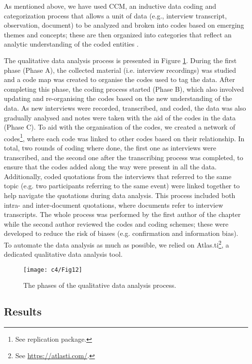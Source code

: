 As mentioned above, we have used CCM, an inductive data coding and categorization process that allows a unit of data (e.g., interview transcript, observation, document) to be analyzed and broken into codes based on emerging themes and concepts; these are then organized into categories that reflect an analytic understanding of the coded entities \cite{Mathison2005}.

The qualitative data analysis process is presented in Figure \ref{c4:fig:qualitative-analysis}. During the first phase (Phase A), the collected material (i.e. interview recordings) was studied and a code map was created to organise the codes used to tag the data.
After completing this phase, the coding process started (Phase B), which also involved updating and re-organising the codes based on the new understanding of the data.
As new interviews were recorded, transcribed, and coded, the data was also gradually analysed and notes were taken with the aid of the codes in the data (Phase C).
To aid with the organisation of the codes, we created a network of codes\footnote{See replication package.}, where each code was linked to other codes based on their relationship.
In total, two rounds of coding where done, the first one as interviews were transcribed, and the second one after the transcribing process was completed, to ensure that the codes added along the way were present in all the data.
Additionally, coded quotations from the interviews that referred to the same topic (e.g. two participants referring to the same event) were linked together to help navigate the quotations during data analysis. This process included both intra- and inter-document quotations, where documents refer to interview transcripts.
The whole process was performed by the first author of the chapter while the second author reviewed the codes and coding schemes; these were developed to reduce the risk of biases (e.g. confirmation and information bias).
To automate the data analysis as much as possible, we relied on Atlas.ti\footnote{See \url{https://atlasti.com/}.}, a dedicated qualitative data analysis tool.

\begin{figure}
    \centering
    \texttt{[image: c4/Fig12]}
    \caption{The phases of the qualitative data analysis process.}\label{c4:fig:qualitative-analysis}
\end{figure}

\subsection{Results}\label{c4:sec:results-rq-4-and-5}

